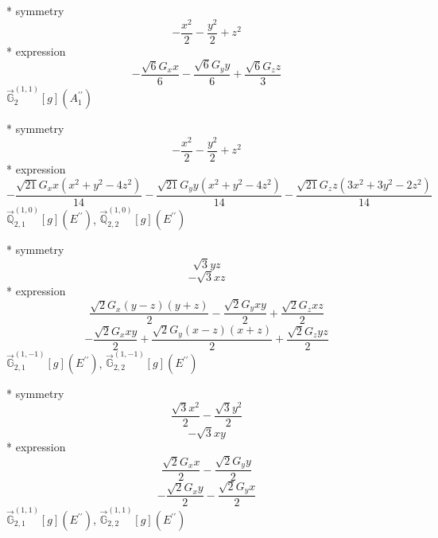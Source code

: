 \documentclass[fleqn,8pt]{jsarticle}
\begin{document}
\noindent\quad ** symmetry
\begin{dmath*}
- \frac{x^{2}}{2} - \frac{y^{2}}{2} + z^{2}
\end{dmath*}
\noindent\quad ** expression
\begin{dmath*}
- \frac{\sqrt{6} G_{x} x}{6} - \frac{\sqrt{6} G_{y} y}{6} + \frac{\sqrt{6} G_{z} z}{3}
\end{dmath*}
\noindent\quad $\vec{\mathbb{G}}_{2}^{(1,1)}[g](A_{1}^{\prime\prime})$

\noindent\quad ** symmetry
\begin{dmath*}
- \frac{x^{2}}{2} - \frac{y^{2}}{2} + z^{2}
\end{dmath*}
\noindent\quad ** expression
\begin{dmath*}
- \frac{\sqrt{21} G_{x} x \left(x^{2} + y^{2} - 4 z^{2}\right)}{14} - \frac{\sqrt{21} G_{y} y \left(x^{2} + y^{2} - 4 z^{2}\right)}{14} - \frac{\sqrt{21} G_{z} z \left(3 x^{2} + 3 y^{2} - 2 z^{2}\right)}{14}
\end{dmath*}
\noindent\quad $\vec{\mathbb{Q}}_{2,1}^{(1,0)}[g](E^{\prime\prime})$, $\vec{\mathbb{Q}}_{2,2}^{(1,0)}[g](E^{\prime\prime})$

\noindent\quad ** symmetry
\begin{dmath*}
\sqrt{3} y z
\end{dmath*}
\begin{dmath*}
- \sqrt{3} x z
\end{dmath*}
\noindent\quad ** expression
\begin{dmath*}
\frac{\sqrt{2} G_{x} \left(y - z\right) \left(y + z\right)}{2} - \frac{\sqrt{2} G_{y} x y}{2} + \frac{\sqrt{2} G_{z} x z}{2}
\end{dmath*}
\begin{dmath*}
- \frac{\sqrt{2} G_{x} x y}{2} + \frac{\sqrt{2} G_{y} \left(x - z\right) \left(x + z\right)}{2} + \frac{\sqrt{2} G_{z} y z}{2}
\end{dmath*}
\noindent\quad $\vec{\mathbb{G}}_{2,1}^{(1,-1)}[g](E^{\prime\prime})$, $\vec{\mathbb{G}}_{2,2}^{(1,-1)}[g](E^{\prime\prime})$

\noindent\quad ** symmetry
\begin{dmath*}
\frac{\sqrt{3} x^{2}}{2} - \frac{\sqrt{3} y^{2}}{2}
\end{dmath*}
\begin{dmath*}
- \sqrt{3} x y
\end{dmath*}
\noindent\quad ** expression
\begin{dmath*}
\frac{\sqrt{2} G_{x} x}{2} - \frac{\sqrt{2} G_{y} y}{2}
\end{dmath*}
\begin{dmath*}
- \frac{\sqrt{2} G_{x} y}{2} - \frac{\sqrt{2} G_{y} x}{2}
\end{dmath*}
\noindent\quad $\vec{\mathbb{G}}_{2,1}^{(1,1)}[g](E^{\prime\prime})$, $\vec{\mathbb{G}}_{2,2}^{(1,1)}[g](E^{\prime\prime})$
\end{document}
